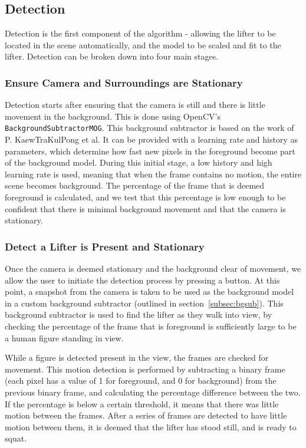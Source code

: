 \subsection{Detection}

Detection is the first component of the algorithm - allowing the lifter to be located in the scene automatically, and the model to be scaled and fit to the lifter. Detection can be broken down into four main stages.

\subsubsection{Ensure Camera and Surroundings are Stationary}
Detection starts after ensuring that the camera is still and there is little movement in the background. This is done using OpenCV's \texttt{BackgroundSubtractorMOG}. This background subtractor is based on the work of P. KaewTraKulPong et al\cite{backgroundsubmog}. It can be provided with a learning rate and history as parameters, which determine how fast new pixels in the foreground become part of the background model. During this initial stage, a low history and high learning rate is used, meaning that when the frame contains no motion, the entire scene becomes background. The percentage of the frame that is deemed foreground is calculated, and we test that this percentage is low enough to be confident that there is minimal background movement and that the camera is stationary.

\subsubsection{Detect a Lifter is Present and Stationary}
Once the camera is deemed stationary and the background clear of movement, we allow the user to initiate the detection process by pressing a button. At this point, a snapshot from the camera is taken to be used as the background model in a custom background subtractor (outlined in section~\ref{subsec:bgsub}). This background subtractor is used to find the lifter as they walk into view, by checking the percentage of the frame that is foreground is sufficiently large to be a human figure standing in view. 

While a figure is detected present in the view, the frames are checked for movement. This motion detection is performed by subtracting a binary frame (each pixel has a value of 1 for foreground, and 0 for background) from the previous binary frame, and calculating the percentage difference between the two. If the percentage is below a certain threshold, it means that there was little motion between the frames. After a series of frames are detected to have little motion between them, it is deemed that the lifter has stood still, and is ready to squat.

